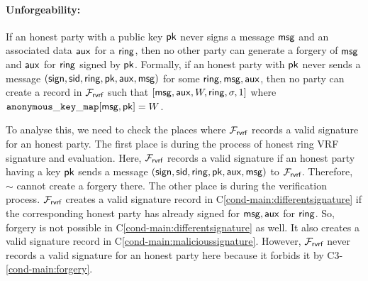 	\paragraph{Unforgeability:}  If an honest party with a public key $ \mathsf{pk} $ never signs a message $ \mathsf{msg} $  and an associated data $ \mathsf{aux} $ for a $ \mathsf{ring} $, then no other party can generate a  forgery of $ \mathsf{msg} $ and $ \mathsf{aux} $ for $ \mathsf{ring} $ signed by $ \mathsf{pk} $. Formally, if an honest party with $ \mathsf{pk} $ never sends a message $(\mathsf{sign}, \textsf{sid}, \mathsf{ring}, \mathsf{pk},\mathsf{aux}, \mathsf{msg})$ for some $ \mathsf{ring}, \mathsf{msg}, \mathsf{aux} $, then  no party can create a record in $ \mathcal{F}_{\textsf{rvrf}} $ such that $ [\mathsf{msg}, \mathsf{aux},W,\mathsf{ring}, \sigma, 1] $ where $ \mathtt{anonymous\_key\_map}[\mathsf{msg},\mathsf{pk}] = W $.
	
	To analyse this, we need to check the places where $ \mathcal{F}_{\textsf{rvrf}} $ records a valid signature for an honest party. The first place is during the process of honest ring VRF signature and evaluation. Here, $ \mathcal{F}_{\textsf{rvrf}} $ records a valid signature if an honest party having a key $ \mathsf{pk} $ sends a message $ (\mathsf{sign}, \textsf{sid},\mathsf{ring},\mathsf{pk},\mathsf{aux},\mathsf{msg}) $ to $ \mathcal{F}_{\textsf{rvrf}} $. Therefore, 	$ \sim $ cannot create a forgery there.
	The other place is during the verification process. $ \mathcal{F}_{\textsf{rvrf}} $ creates a valid signature record in C\ref{cond-main:differentsignature} if the corresponding honest party has already signed for $ \mathsf{msg}, \mathsf{aux} $ for $ \mathsf{ring} $. So, forgery is not possible  in C\ref{cond-main:differentsignature} as well. It also creates a valid signature record in C\ref{cond-main:malicioussignature}. However, $ \mathcal{F}_{\textsf{rvrf}} $ never records a valid signature  for an honest party here because it forbids it by C3-\ref{cond-main:forgery}.
	
	
	
